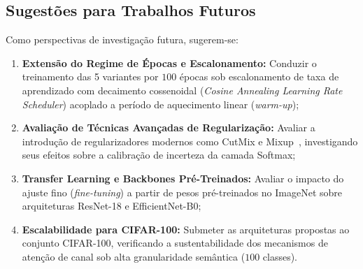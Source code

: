 \documentclass[runningheads]{llncs}
\begin{document}
\subsection{Sugest\~{o}es para Trabalhos Futuros}
Como perspectivas de investiga\c{c}\~{a}o futura, sugerem-se:
\begin{enumerate}
    \item \textbf{Extens\~{a}o do Regime de \'{E}pocas e Escalonamento:} Conduzir o treinamento das 5 variantes por $100$ \'{e}pocas sob escalonamento de taxa de aprendizado com decaimento cossenoidal (\textit{Cosine Annealing Learning Rate Scheduler}) acoplado a per\'{i}odo de aquecimento linear (\textit{warm-up});
    \item \textbf{Avalia\c{c}\~{a}o de T\'{e}cnicas Avan\c{c}adas de Regulariza\c{c}\~{a}o:} Avaliar a introdu\c{c}\~{a}o de regularizadores modernos como CutMix e Mixup~\cite{zhang2018mixup}, investigando seus efeitos sobre a calibra\c{c}\~{a}o de incerteza da camada Softmax;
    \item \textbf{Transfer Learning e Backbones Pr\'{e}-Treinados:} Avaliar o impacto do ajuste fino (\textit{fine-tuning}) a partir de pesos pr\'{e}-treinados no ImageNet sobre arquiteturas ResNet-18 e EfficientNet-B0;
    \item \textbf{Escalabilidade para CIFAR-100:} Submeter as arquiteturas propostas ao conjunto CIFAR-100, verificando a sustentabilidade dos mecanismos de aten\c{c}\~{a}o de canal sob alta granularidade sem\^{a}ntica ($100$ classes).
\end{enumerate}



\end{document}
